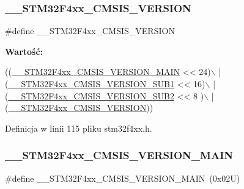 \subsubsection{\texorpdfstring{\+\_\+\+\_\+\+S\+T\+M32\+F4xx\+\_\+\+C\+M\+S\+I\+S\+\_\+\+V\+E\+R\+S\+I\+ON}{\_\_STM32F4xx\_CMSIS\_VERSION}}
{\footnotesize\ttfamily \#define \+\_\+\+\_\+\+S\+T\+M32\+F4xx\+\_\+\+C\+M\+S\+I\+S\+\_\+\+V\+E\+R\+S\+I\+ON}

{\bfseries Wartość\+:}
\begin{DoxyCode}
((\hyperlink{group___library__configuration__section_gaf867da11218022a14245b854f6be6a40}{\_\_STM32F4xx\_CMSIS\_VERSION\_MAIN} << 24)\(\backslash\)
                                         |(\hyperlink{group___library__configuration__section_ga4841e20bc5159a594936808c113ae3bc}{\_\_STM32F4xx\_CMSIS\_VERSION\_SUB1} << 
      16)\(\backslash\)
                                         |(\hyperlink{group___library__configuration__section_ga6ccbf6336bfb67bf4daeb05eba18a5e3}{\_\_STM32F4xx\_CMSIS\_VERSION\_SUB2} << 
      8 )\(\backslash\)
                                         |(\hyperlink{group___library__configuration__section_ga9e8a65cc42b85335938665a12c37cacf}{\_\_STM32F4xx\_CMSIS\_VERSION}))
\end{DoxyCode}


Definicja w linii 115 pliku stm32f4xx.\+h.

\mbox{\label{group___library__configuration__section_gaf867da11218022a14245b854f6be6a40}} 
\subsubsection{\texorpdfstring{\+\_\+\+\_\+\+S\+T\+M32\+F4xx\+\_\+\+C\+M\+S\+I\+S\+\_\+\+V\+E\+R\+S\+I\+O\+N\+\_\+\+M\+A\+IN}{\_\_STM32F4xx\_CMSIS\_VERSION\_MAIN}}
{\footnotesize\ttfamily \#define \+\_\+\+\_\+\+S\+T\+M32\+F4xx\+\_\+\+C\+M\+S\+I\+S\+\_\+\+V\+E\+R\+S\+I\+O\+N\+\_\+\+M\+A\+IN~(0x02\+U)}



